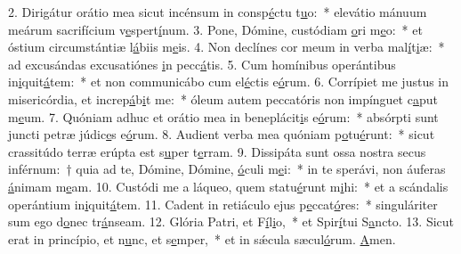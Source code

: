 2. Dirigátur orátio mea sicut incénsum in consp\uline{é}ctu t\uline{u}o:~* elevátio mánuum meárum sacrifícium v\uline{e}spert\uline{í}num.
3. Pone, Dómine, custódiam \uline{o}ri m\uline{e}o:~* et óstium circumstántiæ l\uline{á}biis m\uline{e}is.
4. Non declínes cor meum in verba mal\uline{í}t\uline{i}æ:~* ad excusándas excusatiónes \uline{i}n pecc\uline{á}tis.
5. Cum homínibus operántibus in\uline{i}quit\uline{á}tem:~* et non communicábo cum el\uline{é}ctis e\uline{ó}rum.
6. Corrípiet me justus in misericórdia, et increp\uline{á}b\uline{i}t me:~* óleum autem peccatóris non impínguet c\uline{a}put m\uline{e}um.
7. Quóniam adhuc et orátio mea in beneplácit\uline{i}s e\uline{ó}rum:~* absórpti sunt juncti petræ júdic\uline{e}s e\uline{ó}rum.
8. Audient verba mea quóniam p\uline{o}tu\uline{é}runt:~* sicut crassitúdo terræ erúpta est s\uline{u}per t\uline{e}rram.
9. Dissipáta sunt ossa nostra secus inférnum:~† quia ad te, Dómine, Dómine, \uline{ó}culi m\uline{e}i:~* in te sperávi, non áuferas \uline{á}nimam m\uline{e}am.
10. Custódi me a láqueo, quem statu\uline{é}runt m\uline{i}hi:~* et a scándalis operántium in\uline{i}quit\uline{á}tem.
11. Cadent in retiáculo ejus p\uline{e}ccat\uline{ó}res:~* singuláriter sum ego d\uline{o}nec tr\uline{á}nseam.
12. Glória Patri, et F\uline{í}l\uline{i}o,~* et Spir\uline{í}tui S\uline{a}ncto.
13. Sicut erat in princípio, et n\uline{u}nc, et s\uline{e}mper,~* et in sǽcula sæcul\uline{ó}rum. \uline{A}men.
